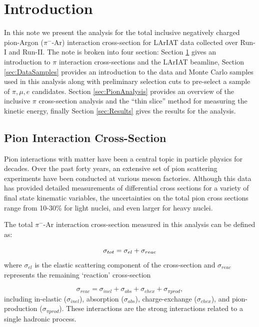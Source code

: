 \section{Introduction}\label{sec:Introduction}

In this note we present the analysis for the total inclusive negatively charged pion-Argon ($\pi^{-}$-Ar) interaction cross-section for LArIAT data collected over Run-I and Run-II. The note is broken into four section: Section \ref{sec:Introduction} gives an introduction to $\pi$ interaction cross-sections and the LArIAT beamline, Section \ref{sec:DataSamples} provides an introduction to the data and Monte Carlo samples used in this analysis along with preliminary selection cuts to pre-select a sample of $\pi, \mu, e$ candidates. Section \ref{sec:PionAnalysis} provides an overview of the inclusive $\pi$ cross-section analysis and the ``thin slice'' method for measuring the kinetic energy, finally Section \ref{sec:Results} gives the results for the analysis.

\subsection{Pion Interaction Cross-Section}\label{sec:PiCrossSection}
Pion interactions with matter have been a central topic in particle physics for decades. Over the past forty years, an extensive set of pion scattering experiments have been conducted at various meson factories. Although this data has provided detailed measurements of differential cross sections for a variety of final state kinematic variables, the uncertainties on the total pion cross sections range from 10-30\% for light nuclei, and even larger for heavy nuclei.

The total $\pi^{-}$-Ar interaction cross-section measured in this analysis can be defined as:

\begin{equation}
\sigma_{tot}= \sigma_{el}+\sigma_{reac}\\
\end{equation}
where $\sigma_{el}$ is the elastic scattering component of the cross-section and $\sigma_{reac}$ represents the remaining `reaction' cross-section

\begin{equation}
\sigma_{reac}=\sigma_{inel}+\sigma_{abs}+\sigma_{chex}+\sigma_{\pi prod},
\end{equation}
including in-elastic ($\sigma_{inel}$), absorption ($\sigma_{abs}$), charge-exchange ($\sigma_{chex}$), and pion-production ($\sigma_{\pi prod}$). These interactions are the strong interactions related to a single hadronic process.

